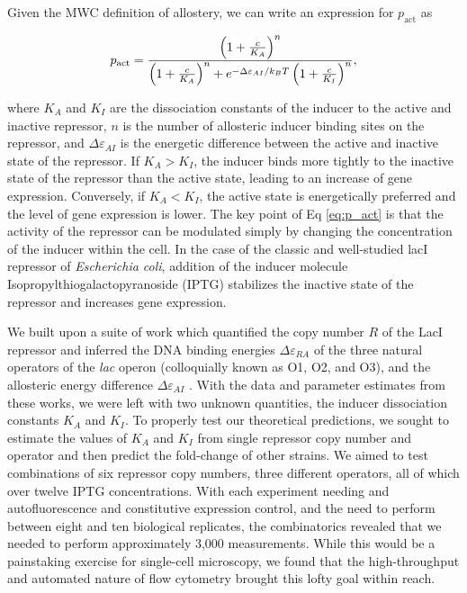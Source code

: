 \documentclass[letterpaper, 10pt]{article}
\begin{document}
Given the MWC definition of allostery, we can write an expression
for $p_\mathrm{act}$ as

\begin{equation}
  p_\mathrm{act} = {\left(1 + {c \over K_A}\right)^n \over \left(1 + {c \over
  K_A}\right)^n + e^{-\Delta\varepsilon_{AI} / k_BT}\left(1 + {c \over
  K_I}\right)^n},
\label{eq:p_act}
\end{equation}

where $K_A$ and $K_I$ are the dissociation constants of the inducer to the
active and inactive repressor, $n$ is the number of allosteric
inducer binding sites on the repressor, and $\Delta\varepsilon_{AI}$ is the
energetic difference between the active and inactive state of the repressor. If
$K_A > K_I$, the inducer binds more tightly to the inactive state of the
repressor than the active state, leading to an increase of gene expression.
Conversely, if $K_A < K_I$, the active state is energetically preferred and the
level of gene expression is lower. The key point of Eq \ref{eq:p_act} is that
the activity of the repressor can be modulated simply by changing the
concentration of the inducer within the cell. In the case of the classic
and well-studied lacI repressor of \textit{Escherichia coli}, addition of the inducer molecule
Isopropylthiogalactopyranoside (IPTG) stabilizes the inactive state of the
repressor and increases gene expression.

We built upon a suite of work which
quantified the copy number $R$ of the LacI repressor and inferred the DNA binding energies
$\Delta\varepsilon_{RA}$ of the three natural operators of the \textit{lac}
operon (colloquially known as O1, O2, and O3), and the allosteric energy
difference $\Delta\varepsilon_{AI}$ \cite{Garcia2011, Brewster2014}. With the data and parameter estimates from
these works, we were left with two unknown quantities, the inducer dissociation
constants $K_A$ and $K_I$. To properly test our theoretical predictions, we sought
to estimate the values of $K_A$ and $K_I$ from single repressor copy number and operator and
then predict the fold-change of other strains. We aimed to test combinations of
six repressor copy numbers, three different operators, all of which over twelve
IPTG concentrations. With each experiment needing and
autofluorescence and constitutive expression control, and the need to perform
between eight and ten biological replicates, the combinatorics revealed that we
needed to perform approximately 3,000 measurements. While this would be a
painstaking exercise for single-cell microscopy, we found that the
high-throughput and automated nature of flow cytometry brought this lofty goal
within reach.
\end{document}
